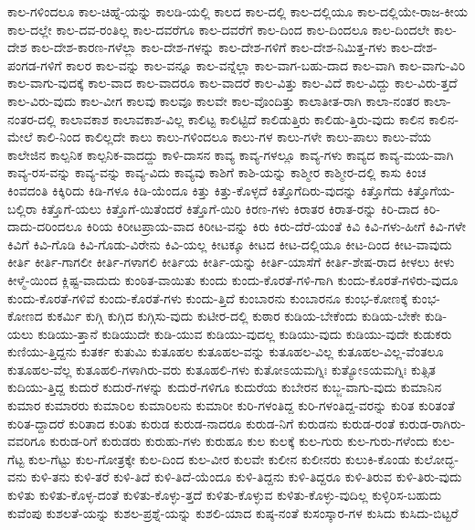 {ಕಾಲ-ಗಳಿಂದಲೂ
ಕಾಲ-ಚಿಹ್ನೆ-ಯನ್ನು
ಕಾಲಡಿ-ಯಲ್ಲಿ
ಕಾಲದ
ಕಾಲ-ದಲ್ಲಿ
ಕಾಲ-ದಲ್ಲಿಯೂ
ಕಾಲ-ದಲ್ಲಿಯೇ-ರಾಜ-ಕೀಯ
ಕಾಲ-ದಲ್ಲೇ
ಕಾಲ-ದವ-ರಂತಿಲ್ಲ
ಕಾಲ-ದವರೆಗೂ
ಕಾಲ-ದವರೆಗೆ
ಕಾಲ-ದಿಂದ
ಕಾಲ-ದಿಂದಲೂ
ಕಾಲ-ದಿಂದಲೇ
ಕಾಲ-ದೇಶ
ಕಾಲ-ದೇಶ-ಕಾರಣ-ಗಳೆಲ್ಲಾ
ಕಾಲ-ದೇಶ-ಗಳನ್ನು
ಕಾಲ-ದೇಶ-ಗಳಿಗೆ
ಕಾಲ-ದೇಶ-ನಿಮಿತ್ತ-ಗಳು
ಕಾಲ-ದೇಶ-ಪಂಗಡ-ಗಳಿಗೆ
ಕಾಲರ
ಕಾಲ-ವನ್ನು
ಕಾಲ-ವನ್ನೂ
ಕಾಲ-ವನ್ನೆಲ್ಲಾ
ಕಾಲ-ವಾಗ-ಬಹು-ದಾದ
ಕಾಲ-ವಾಗಿ
ಕಾಲ-ವಾಗು-ವಿರಿ
ಕಾಲ-ವಾಗು-ವುದಕ್ಕೆ
ಕಾಲ-ವಾದ
ಕಾಲ-ವಾದರೂ
ಕಾಲ-ವಾದರೆ
ಕಾಲ-ವಿತ್ತು
ಕಾಲ-ವಿದೆ
ಕಾಲ-ವಿದ್ದು
ಕಾಲ-ವಿರು-ತ್ತದೆ
ಕಾಲ-ವಿರು-ವುದು
ಕಾಲ-ವೀಗ
ಕಾಲವು
ಕಾಲವೂ
ಕಾಲವೇ
ಕಾಲ-ವೊಂದಿತ್ತು
ಕಾಲಾತೀತ-ರಾಗಿ
ಕಾಲಾ-ನಂತರ
ಕಾಲಾ-ನಂತರ-ದಲ್ಲಿ
ಕಾಲಾವಕಾಶ
ಕಾಲಾವಕಾಶ-ವಿಲ್ಲ
ಕಾಲಿಟ್ಟ
ಕಾಲಿಟ್ಟಿದೆ
ಕಾಲಿಡುತ್ತಿರು
ಕಾಲಿಡು-ತ್ತಿರು-ವುದು
ಕಾಲಿನ
ಕಾಲಿನ-ಮೇಲೆ
ಕಾಲಿ-ನಿಂದ
ಕಾಲಿಲ್ಲದೇ
ಕಾಲು
ಕಾಲು-ಗಳಿಂದಲೂ
ಕಾಲು-ಗಳ
ಕಾಲು-ಗಳೇ
ಕಾಲು-ಪಾಲು
ಕಾಲು-ವೆಯ
ಕಾಲೇಜಿನ
ಕಾಲ್ಪನಿಕ
ಕಾಲ್ಪನಿಕ-ವಾದದ್ದು
ಕಾಳಿ-ದಾಸನ
ಕಾವ್ಯ
ಕಾವ್ಯ-ಗಳಲ್ಲೂ
ಕಾವ್ಯ-ಗಳು
ಕಾವ್ಯದ
ಕಾವ್ಯ-ಮಯ-ವಾಗಿ
ಕಾವ್ಯ-ರಸ-ವನ್ನು
ಕಾವ್ಯ-ವನ್ನು
ಕಾವ್ಯ-ವಿದು
ಕಾವ್ಯವು
ಕಾಶಿಗೆ
ಕಾಶಿ-ಯನ್ನು
ಕಾಶ್ಮೀರ
ಕಾಶ್ಮೀರ-ದಲ್ಲಿ
ಕಾಸು
ಕಿಂಚ
ಕಿಂವದಂತಿ
ಕಿಕ್ಕಿರಿದು
ಕಿಡಿ-ಗಳೂ
ಕಿಡಿ-ಯೆಂದೂ
ಕಿತ್ತು
ಕಿತ್ತು-ಕೊಳ್ಳದೆ
ಕಿತ್ತೊಗೆದಿರು-ವುದನ್ನು
ಕಿತ್ತೊಗೆದು
ಕಿತ್ತೊಗೆಯ-ಬಲ್ಲಿರಾ
ಕಿತ್ತೊಗೆ-ಯಲು
ಕಿತ್ತೊಗೆ-ಯಿತೆಂದರೆ
ಕಿತ್ತೊಗೆ-ಯಿರಿ
ಕಿರಣ-ಗಳು
ಕಿರಾತರ
ಕಿರಾತ-ರನ್ನು
ಕಿರಿ-ದಾದ
ಕಿರಿ-ದಾದು-ದರಿಂದಲೂ
ಕಿರಿಯ
ಕಿರೀಟಪ್ರಾಯ-ವಾದ
ಕಿರೀಟ-ವನ್ನು
ಕಿರು
ಕಿರು-ದೆರೆ-ಯಂತೆ
ಕಿವಿ
ಕಿವಿ-ಗಳು-ಹೀಗೆ
ಕಿವಿ-ಗಳೇ
ಕಿವಿಗೆ
ಕಿವಿ-ಗೊಡಿ
ಕಿವಿ-ಗೊಡು-ವಿರೇನು
ಕಿವಿ-ಯಲ್ಲ
ಕೀಟಕ್ಕೂ
ಕೀಟದ
ಕೀಟ-ದಲ್ಲಿಯೂ
ಕೀಟ-ದಿಂದ
ಕೀಟ-ವಾವುದು
ಕೀರ್ತಿ
ಕೀರ್ತಿ-ಗಾಗಲೀ
ಕೀರ್ತಿ-ಗಳಾಗಲಿ
ಕೀರ್ತಿಯ
ಕೀರ್ತಿ-ಯನ್ನು
ಕೀರ್ತಿ-ಯಾಸೆಗೆ
ಕೀರ್ತಿ-ಶೇಷ-ರಾದ
ಕೀಳಲು
ಕೀಳು
ಕೀಳ್ಮೆ-ಯಿಂದ
ಕ್ಲಿಷ್ಟ-ವಾದುದು
ಕುಂಠಿತ-ವಾಯಿತು
ಕುಂದು
ಕುಂದು-ಕೊರತೆ-ಗಳಿ-ಗಾಗಿ
ಕುಂದು-ಕೊರತೆ-ಗಳಿರು-ವುದೂ
ಕುಂದು-ಕೊರತೆ-ಗಳಿವೆ
ಕುಂದು-ಕೊರತೆ-ಗಳು
ಕುಂದು-ತ್ತಿದೆ
ಕುಂಬಾರನು
ಕುಂಬಾರನೂ
ಕುಂಭ-ಕೋಣಕ್ಕೆ
ಕುಂಭ-ಕೋಣದ
ಕುಕರ್ಮಿ
ಕುಗ್ಗಿ
ಕುಗ್ಗಿದ
ಕುಗ್ಗಿಸು-ವುದು
ಕುಟೀರ-ದಲ್ಲಿ
ಕುಠಾರ
ಕುಡಿಯ-ಬೇಕೆಂದು
ಕುಡಿಯ-ಬೇಕೇ
ಕುಡಿ-ಯಲು
ಕುಡಿಯು-ತ್ತಾನೆ
ಕುಡಿಯುದೇ
ಕುಡಿ-ಯುವ
ಕುಡಿಯು-ವುದಲ್ಲ
ಕುಡಿಯು-ವುದು
ಕುಡಿಯು-ವುದೇ
ಕುಡುಕರು
ಕುಣಿಯು-ತ್ತಿದ್ದನು
ಕುತರ್ಕ
ಕುತುಮಿ
ಕುತೂಹಲ
ಕುತೂಹಲ-ವನ್ನು
ಕುತೂಹಲ-ವಿಲ್ಲ
ಕುತೂಹಲ-ವಿಲ್ಲ-ವೆಂತಲೂ
ಕುತೂಹಲ-ವೆಲ್ಲ
ಕುತೂಹಲಿ-ಗಳಾಗಿರು-ವರು
ಕುತೂಹಲಿ-ಗಳು
ಕುತೋಽಯಮಗ್ನಿಃ
ಕುತ್ಯೋಽಯಮಗ್ನಿಃ
ಕುತ್ಸಿತ
ಕುದಿಯು-ತ್ತಿದ್ದ
ಕುದುರೆ
ಕುದುರೆ-ಗಳನ್ನು
ಕುದುರೆ-ಗಳಿಗೂ
ಕುದುರೆಯ
ಕುಬೇರನ
ಕುಬ್ಜ-ವಾಗು-ವುದು
ಕುಮಾನಿನ
ಕುಮಾರ
ಕುಮಾರರು
ಕುಮಾರಿಲ
ಕುಮಾರಿಲನು
ಕುಮಾರೀ
ಕುರಿ-ಗಳಂತಿದ್ದ
ಕುರಿ-ಗಳಂತಿದ್ದ-ವರನ್ನು
ಕುರಿತ
ಕುರಿತಂತೆ
ಕುರಿತ-ದ್ದಾದರೆ
ಕುರಿತಾದ
ಕುರಿತು
ಕುರುಡ
ಕುರುಡ-ನಾದರೂ
ಕುರುಡ-ನಿಗೆ
ಕುರುಡನು
ಕುರುಡ-ರಂತೆ
ಕುರುಡ-ರಾಗಿರು-ವವರಿಗೂ
ಕುರುಡ-ರಿಗೆ
ಕುರುಡರು
ಕುರುಹು-ಗಳು
ಕುರುಹೂ
ಕುಲ
ಕುಲಕ್ಕೆ
ಕುಲ-ಗುರು
ಕುಲ-ಗುರು-ಗಳೆಂದು
ಕುಲ-ಗೆಟ್ಟ
ಕುಲ-ಗೆಟ್ಟು
ಕುಲ-ಗೋತ್ರಕ್ಕೇ
ಕುಲ-ದಿಂದ
ಕುಲ-ವೀರ
ಕುಲವೇ
ಕುಲೀನ
ಕುಲೀನರು
ಕುಲುಕಿ-ಕೊಂಡು
ಕುಲೋದ್ಭ-ವನು
ಕುಳಿ-ತನು
ಕುಳಿ-ತರೆ
ಕುಳಿ-ತಿದೆ
ಕುಳಿ-ತಿದೆ-ಯೆಂದೂ
ಕುಳಿ-ತಿದ್ದನು
ಕುಳಿ-ತಿದ್ದರೂ
ಕುಳಿ-ತಿರುವ
ಕುಳಿ-ತಿರು-ವುದು
ಕುಳಿತು
ಕುಳಿತು-ಕೊಳ್ಳ-ದಂತೆ
ಕುಳಿತು-ಕೊಳ್ಳು-ತ್ತದೆ
ಕುಳಿತು-ಕೊಳ್ಳುವ
ಕುಳಿತು-ಕೊಳ್ಳು-ವುದಿಲ್ಲ
ಕುಳ್ಳಿರಿಸ-ಬಹುದು
ಕುವೆಂಪು
ಕುಶಲತೆ-ಯನ್ನು
ಕುಶಲ-ಪ್ರಶ್ನೆ-ಯನ್ನು
ಕುಶಲಿ-ಯಾದ
ಕುಷ್ಠ-ನಂತೆ
ಕುಸಂಸ್ಕಾರ-ಗಳ
ಕುಸಿದು
ಕುಸಿದು-ಬಿಟ್ಟರೆ
}
